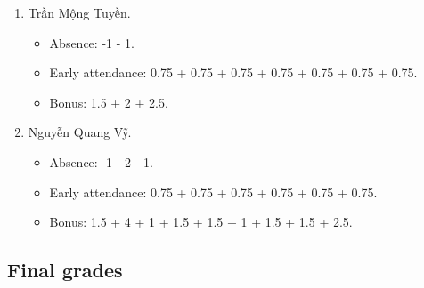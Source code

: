 \documentclass{article}
\begin{document}
\begin{enumerate}
\begin{itemize}
	\end{itemize}
	\item {\sc Trần Mộng Tuyền.}
	\begin{itemize}
		\item Absence: -1 - 1.
		\item Early attendance: 0.75 + 0.75 + 0.75 + 0.75 + 0.75 + 0.75 + 0.75.
        \item Bonus: 1.5 + 2 + 2.5.
	\end{itemize}
	\item {\sc Nguyễn Quang Vỹ.}
	\begin{itemize}
		\item Absence: -1 - 2 - 1.
		\item Early attendance: 0.75 + 0.75 + 0.75 + 0.75 + 0.75 + 0.75.
		\item Bonus: 1.5 + 4 + 1 + 1.5 + 1.5 + 1 + 1.5 + 1.5 + 2.5.
	\end{itemize}
\end{enumerate}


\subsection{Final grades}
\end{document}
